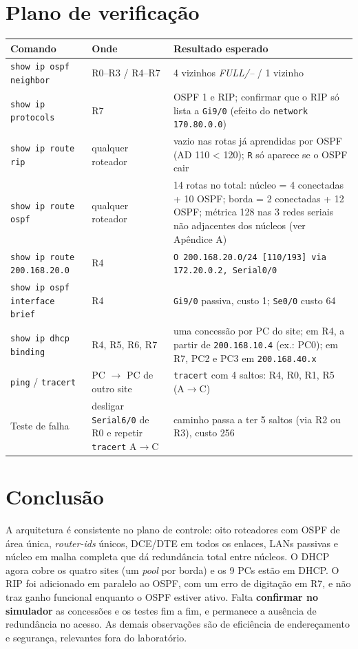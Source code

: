 \documentclass[12pt,a4paper]{article}
\begin{document}
\section{Plano de verificação}\label{sec:testes}
\begin{table}[H]\centering\small
\begin{tabular}{@{}p{3.2cm}p{4.3cm}p{6.4cm}@{}}\toprule
Comando & Onde & Resultado esperado\\\midrule
\texttt{show ip ospf neighbor} & R0--R3 / R4--R7 & 4 vizinhos \textit{FULL/--} / 1 vizinho\\
\texttt{show ip protocols} & R7 & OSPF 1 e RIP; confirmar que o RIP só lista a \texttt{Gi9/0} (efeito do \texttt{network 170.80.0.0})\\
\texttt{show ip route rip} & qualquer roteador & vazio nas rotas já aprendidas por OSPF (AD 110 < 120); \texttt{R} só aparece se o OSPF cair\\
\texttt{show ip route ospf} & qualquer roteador & 14 rotas no total: núcleo = 4 conectadas + 10 OSPF; borda = 2 conectadas + 12 OSPF; métrica 128 nas 3 redes seriais não adjacentes dos núcleos (ver Apêndice A)\\
\texttt{show ip route 200.168.20.0} & R4 & \texttt{O 200.168.20.0/24 [110/193] via 172.20.0.2, Serial0/0}\\
\texttt{show ip ospf interface brief} & R4 & \texttt{Gi9/0} passiva, custo 1; \texttt{Se0/0} custo 64\\
\texttt{show ip dhcp binding} & R4, R5, R6, R7 & uma concessão por PC do site; em R4, a partir de \texttt{200.168.10.4} (ex.: PC0); em R7, PC2 e PC3 em \texttt{200.168.40.x}\\
\texttt{ping} / \texttt{tracert} & PC $\to$ PC de outro site & \texttt{tracert} com 4 saltos: R4, R0, R1, R5 (A$\to$C)\\
Teste de falha & desligar \texttt{Serial6/0} de R0 e repetir \texttt{tracert} A$\to$C & caminho passa a ter 5 saltos (via R2 ou R3), custo 256\\ \bottomrule
\end{tabular}
\end{table}

\section{Conclusão}
A arquitetura é consistente no plano de controle: oito roteadores com OSPF de área única, \textit{router-ids} únicos, DCE/DTE em todos os enlaces, LANs passivas e núcleo em malha completa que dá redundância total entre núcleos. O DHCP agora cobre os quatro sites (um \textit{pool} por borda) e os 9 PCs estão em DHCP. O RIP foi adicionado em paralelo ao OSPF, com um erro de digitação em R7, e não traz ganho funcional enquanto o OSPF estiver ativo. Falta \textbf{confirmar no simulador} as concessões e os testes fim a fim, e permanece a ausência de redundância no acesso. As demais observações são de eficiência de endereçamento e segurança, relevantes fora do laboratório.
\end{document}
